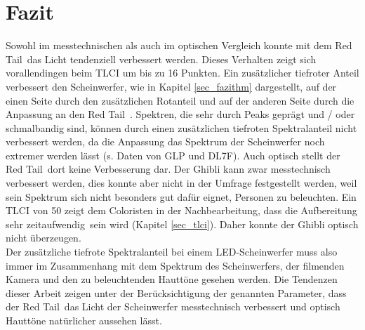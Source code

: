 \chapter{Fazit}
Sowohl im messtechnischen als auch im optischen Vergleich konnte mit dem \glqq Red Tail\grqq\ das Licht tendenziell verbessert werden. Dieses Verhalten zeigt sich vorallendingen beim TLCI um bis zu 16 Punkten. Ein zusätzlicher tiefroter Anteil verbessert den Scheinwerfer, wie in Kapitel \ref{sec_fazithm} dargestellt, auf der einen Seite durch den zusätzlichen Rotanteil und auf der anderen Seite durch die Anpassung an den \glqq Red Tail\grqq\ . Spektren, die sehr durch Peaks geprägt und / oder schmalbandig sind, können durch einen zusätzlichen tiefroten Spektralanteil nicht verbessert werden, da die Anpassung das Spektrum der Scheinwerfer noch extremer werden lässt (s. Daten von GLP und DL7F). Auch optisch stellt der \glqq Red Tail\grqq\ dort keine Verbesserung dar. Der Ghibli kann zwar messtechnisch verbessert werden, dies konnte aber nicht in der Umfrage festgestellt werden, weil sein Spektrum sich nicht besonders gut dafür eignet, Personen zu beleuchten. Ein TLCI von 50 zeigt dem Coloristen in der Nachbearbeitung, dass die \glqq Aufbereitung sehr zeitaufwendig\grqq\ sein wird (Kapitel \ref{sec_tlci}). Daher konnte der Ghibli optisch nicht überzeugen.\\
Der zusätzliche tiefrote Spektralanteil bei einem LED-Scheinwerfer muss also immer im Zusammenhang mit dem Spektrum des Scheinwerfers, der filmenden Kamera und den zu beleuchtenden Hauttöne gesehen werden. Die Tendenzen dieser Arbeit zeigen unter der Berücksichtigung der genannten Parameter, dass der \glqq Red Tail\grqq\ das Licht der Scheinwerfer messtechnisch verbessert und optisch Hauttöne natürlicher aussehen lässt.

  



